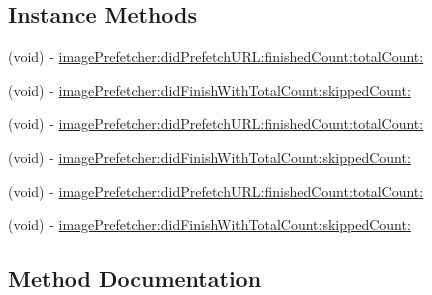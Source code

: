 \subsection*{Instance Methods}
\begin{DoxyCompactItemize}
\item 
(void) -\/ \mbox{\hyperlink{protocol_s_d_web_image_prefetcher_delegate_01-p_a14a43983778be7356fffa0f08052b617}{image\+Prefetcher\+:did\+Prefetch\+U\+R\+L\+:finished\+Count\+:total\+Count\+:}}
\item 
(void) -\/ \mbox{\hyperlink{protocol_s_d_web_image_prefetcher_delegate_01-p_a2c2a02694814d47f95202a5e959279c9}{image\+Prefetcher\+:did\+Finish\+With\+Total\+Count\+:skipped\+Count\+:}}
\item 
(void) -\/ \mbox{\hyperlink{protocol_s_d_web_image_prefetcher_delegate_01-p_a14a43983778be7356fffa0f08052b617}{image\+Prefetcher\+:did\+Prefetch\+U\+R\+L\+:finished\+Count\+:total\+Count\+:}}
\item 
(void) -\/ \mbox{\hyperlink{protocol_s_d_web_image_prefetcher_delegate_01-p_a2c2a02694814d47f95202a5e959279c9}{image\+Prefetcher\+:did\+Finish\+With\+Total\+Count\+:skipped\+Count\+:}}
\item 
(void) -\/ \mbox{\hyperlink{protocol_s_d_web_image_prefetcher_delegate_01-p_a14a43983778be7356fffa0f08052b617}{image\+Prefetcher\+:did\+Prefetch\+U\+R\+L\+:finished\+Count\+:total\+Count\+:}}
\item 
(void) -\/ \mbox{\hyperlink{protocol_s_d_web_image_prefetcher_delegate_01-p_a2c2a02694814d47f95202a5e959279c9}{image\+Prefetcher\+:did\+Finish\+With\+Total\+Count\+:skipped\+Count\+:}}
\end{DoxyCompactItemize}


\subsection{Method Documentation}
\mbox{\label{protocol_s_d_web_image_prefetcher_delegate_01-p_a2c2a02694814d47f95202a5e959279c9}} 
